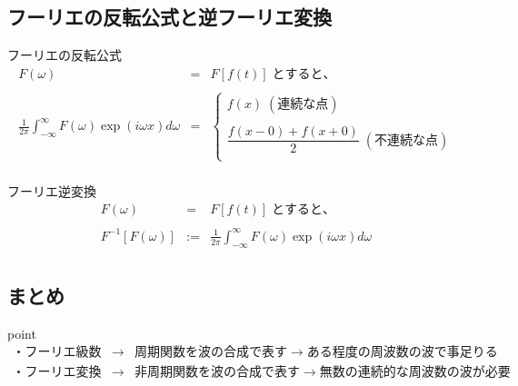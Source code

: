 \documentclass[a4paper]{jsarticle}
\begin{document}
\subsection{フーリエの反転公式と逆フーリエ変換}
\begin{itembox}[l]{フーリエの反転公式}
    \begin{eqnarray*}
        F\left(\omega\right)&=&F\left[f\left(t\right)\right]\;とすると、\\
        \\
        \frac{1}{2\pi}\int^{\infty}_{-\infty} F\left(\omega\right) \exp \left(i\omega x\right) d\omega &=&
        \begin{cases}
            f\left(x\right) \; \left(連続な点\right)                                  \\
            \\
            \dfrac{f\left(x-0\right)+f\left(x+0\right)}{2} \; \left(不連続な点\right) \\
        \end{cases}\\
    \end{eqnarray*}
\end{itembox}
\begin{itembox}[l]{フーリエ逆変換}
    \begin{eqnarray*}
        F\left(\omega\right)&=&F\left[f\left(t\right)\right]\;とすると、\\
        \\
        F^{-1}\left[F\left(\omega\right)\right] &:=&  \frac{1}{2\pi}\int^{\infty}_{-\infty} F\left(\omega\right) \exp \left(i\omega x\right) d\omega\\
    \end{eqnarray*}
\end{itembox}

\subsection{まとめ}
\begin{itembox}[l]{point}
    \begin{eqnarray*}
        ・フーリエ級数 &\rightarrow& 周期関数を波の合成で表す  \rightarrow ある程度の周波数の波で事足りる\\
        ・フーリエ変換 &\rightarrow& 非周期関数を波の合成で表す \rightarrow 無数の連続的な周波数の波が必要\\
    \end{eqnarray*}
\end{itembox}
\end{document}

